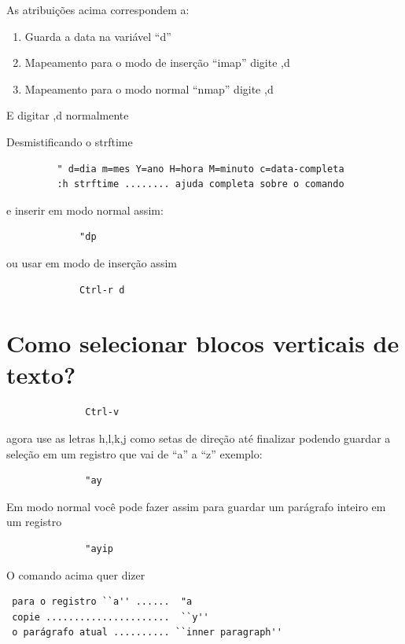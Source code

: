 \documentclass[10pt,a4paper,openany]{book}
\begin{document}
As atribuições acima correspondem a:

\begin{enumerate}
 \item  Guarda a data na variável ``d''
 \item  Mapeamento para o modo de inserção ``imap'' digite ,d
 \item  Mapeamento para o modo normal ``nmap'' digite ,d
\end{enumerate}

E digitar ,d normalmente

Desmistificando o strftime
\begin{verbatim}
		 " d=dia m=mes Y=ano H=hora M=minuto c=data-completa
		 :h strftime ........ ajuda completa sobre o comando
\end{verbatim}

e inserir em modo normal assim:

\begin{verbatim}
			 "dp
\end{verbatim}

ou usar em modo de inserção assim

\begin{verbatim}
			 Ctrl-r d
\end{verbatim}

\section{Como selecionar blocos verticais de texto?}
\label{Como selecionar blocos verticais de texto?}

\begin{verbatim}
			  Ctrl-v
\end{verbatim}

agora use as letras h,l,k,j como setas de direção até finalizar
podendo guardar a seleção em um registro que vai de ``a'' a ``z'' exemplo:

\begin{verbatim}
			  "ay
\end{verbatim}

Em modo normal você pode fazer assim para guardar um parágrafo inteiro em um registro

\begin{verbatim}
			  "ayip
\end{verbatim}

O comando acima quer dizer

\begin{verbatim}
 para o registro ``a'' ......  "a
 copie ......................  ``y''
 o parágrafo atual .......... ``inner paragraph''
\end{verbatim}
\end{document}
